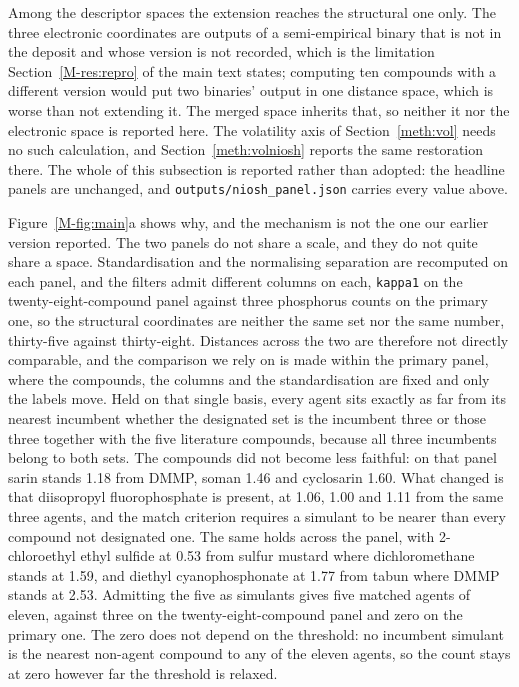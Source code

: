 \documentclass[11pt,a4paper]{article}
\begin{document}
Among the descriptor spaces the extension reaches the structural one only. The
three electronic coordinates are outputs of a semi-empirical binary that is not in the deposit
and whose version is not recorded, which is the limitation
Section~\ref{M-res:repro} of the main text states; computing ten compounds with
a different version would put two binaries' output in one distance space, which
is worse than not extending it. The merged space inherits that, so neither it
nor the electronic space is reported here. The volatility axis of
Section~\ref{meth:vol} needs no such calculation, and
Section~\ref{meth:volniosh} reports the same restoration there. The whole of this subsection is
reported rather than adopted: the headline panels are unchanged, and
\texttt{outputs/niosh\_panel.json} carries every value above.




Figure~\ref{M-fig:main}a shows why, and the mechanism is not
the one our earlier version reported. The two panels do not share a scale, and
they do not quite share a space. Standardisation and the normalising separation
are recomputed on each panel, and the filters admit different columns on
each, \texttt{kappa1} on the twenty-eight-compound panel against three
phosphorus counts on the primary one, so the structural coordinates are neither
the same set nor the same number, thirty-five against thirty-eight.
Distances across the two are therefore not directly comparable, and the
comparison we rely on is made within the primary panel, where the compounds,
the columns and the standardisation are fixed and only the labels move. Held on
that single basis, every agent sits exactly as far from its nearest incumbent
whether the designated set is the incumbent three or those three together with
the five literature compounds, because all three incumbents belong to both
sets. The compounds did not become less faithful: on that panel sarin stands
1.18 from DMMP, soman 1.46 and cyclosarin 1.60. What changed is that diisopropyl
fluorophosphate is present, at 1.06, 1.00 and 1.11 from the same three agents,
and the match criterion requires a simulant to be nearer than every compound not
designated one. The same holds across the panel, with 2-chloroethyl ethyl
sulfide at 0.53 from sulfur mustard where dichloromethane stands at 1.59, and
diethyl cyanophosphonate at 1.77 from tabun where DMMP stands at 2.53.
Admitting the five as simulants gives five matched agents of eleven, against
three on the twenty-eight-compound panel and zero on the primary one. The zero
does not depend on the threshold: no incumbent simulant is the
nearest non-agent compound to any of the eleven agents, so the count stays at
zero however far the threshold is relaxed.
\end{document}
